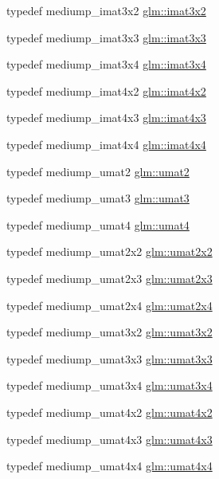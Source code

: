\begin{DoxyCompactItemize}
\item 
typedef mediump\+\_\+imat3x2 \hyperlink{group__gtc__matrix__integer_ga04deef94cdfdd3b3b2706e10a32ef7f3}{glm\+::imat3x2}
\item 
typedef mediump\+\_\+imat3x3 \hyperlink{group__gtc__matrix__integer_gaeff9ef8f56cccc828d6b897923e75402}{glm\+::imat3x3}
\item 
typedef mediump\+\_\+imat3x4 \hyperlink{group__gtc__matrix__integer_gaee5507e6cbbdd05841a0c174e60dd036}{glm\+::imat3x4}
\item 
typedef mediump\+\_\+imat4x2 \hyperlink{group__gtc__matrix__integer_ga7e733984837e0e7aa9f4aac18f632f63}{glm\+::imat4x2}
\item 
typedef mediump\+\_\+imat4x3 \hyperlink{group__gtc__matrix__integer_gaa4cca8e80c0603239eda452860063844}{glm\+::imat4x3}
\item 
typedef mediump\+\_\+imat4x4 \hyperlink{group__gtc__matrix__integer_ga367d8d5281ff82f1215a227dd2ea5ba9}{glm\+::imat4x4}
\item 
typedef mediump\+\_\+umat2 \hyperlink{group__gtc__matrix__integer_gae2d45c058cfa0b60ab4df0cdda2d8516}{glm\+::umat2}
\item 
typedef mediump\+\_\+umat3 \hyperlink{group__gtc__matrix__integer_ga8b8fbc858e28abf8fc344744f8d6d368}{glm\+::umat3}
\item 
typedef mediump\+\_\+umat4 \hyperlink{group__gtc__matrix__integer_ga7ae562000d8a8d193e9f93cf51e2e113}{glm\+::umat4}
\item 
typedef mediump\+\_\+umat2x2 \hyperlink{group__gtc__matrix__integer_gad3c997b31dd69bdb4787867e758ed48d}{glm\+::umat2x2}
\item 
typedef mediump\+\_\+umat2x3 \hyperlink{group__gtc__matrix__integer_ga890ae28f9230794138b2c89f44ce3376}{glm\+::umat2x3}
\item 
typedef mediump\+\_\+umat2x4 \hyperlink{group__gtc__matrix__integer_ga3b23b164240cf4dfb429776da7be9d88}{glm\+::umat2x4}
\item 
typedef mediump\+\_\+umat3x2 \hyperlink{group__gtc__matrix__integer_ga257300f2710612877ef45438a366e308}{glm\+::umat3x2}
\item 
typedef mediump\+\_\+umat3x3 \hyperlink{group__gtc__matrix__integer_gab80b6501ba1b2c40119a0f2d256f4c97}{glm\+::umat3x3}
\item 
typedef mediump\+\_\+umat3x4 \hyperlink{group__gtc__matrix__integer_ga5410857d098a989a30b4017100bc2ff7}{glm\+::umat3x4}
\item 
typedef mediump\+\_\+umat4x2 \hyperlink{group__gtc__matrix__integer_ga13e8392218e9b6e1b7f194a21b5c88bf}{glm\+::umat4x2}
\item 
typedef mediump\+\_\+umat4x3 \hyperlink{group__gtc__matrix__integer_ga08373f5588a54da1a48e5e55c7d51004}{glm\+::umat4x3}
\item 
typedef mediump\+\_\+umat4x4 \hyperlink{group__gtc__matrix__integer_gae0931b79e808fb0983848778a60eb548}{glm\+::umat4x4}
\end{DoxyCompactItemize}


